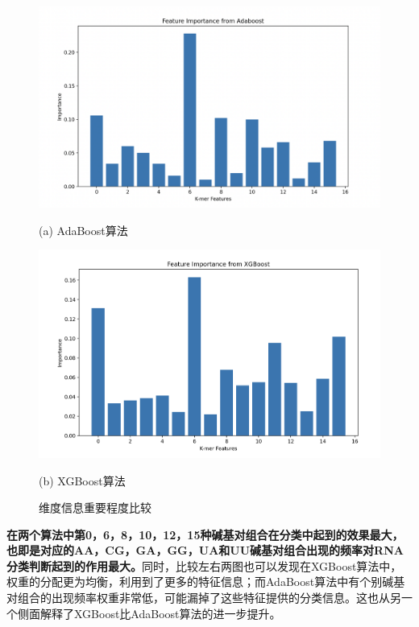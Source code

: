 \documentclass[a4paper,11pt,AutoFakeBold]{ctexart}
\begin{document}
\begin{figure}[h]
    \centering
    \begin{minipage}{0.49\linewidth}
        \centering
        \includegraphics[height=0.67\linewidth]{Figures/AdaBoost_Feature.png}
        \caption*{(a) AdaBoost算法}
    \end{minipage}
    \begin{minipage}{0.49\linewidth}
        \centering
        \includegraphics[height=0.67\linewidth]{Figures/XGBoost_Feature.png}
        \caption*{(b) XGBoost算法}
    \end{minipage}
    \caption{维度信息重要程度比较}
    \label{fig:维度信息重要程度比较}
\end{figure}

\textbf{在两个算法中第0，6，8，10，12，15种碱基对组合在分类中起到的效果最大，也即是对应的AA，CG，GA，GG，UA和UU碱基对组合出现的频率对RNA分类判断起到的作用最大。}同时，比较左右两图也可以发现在XGBoost算法中，权重的分配更为均衡，利用到了更多的特征信息；而AdaBoost算法中有个别碱基对组合的出现频率权重非常低，可能漏掉了这些特征提供的分类信息。这也从另一个侧面解释了XGBoost比AdaBoost算法的进一步提升。
\end{document}
